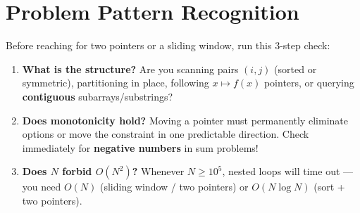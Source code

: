 \documentclass[11pt,a4paper]{article}
\theoremstyle{definition}
\begin{document}
\section{Problem Pattern Recognition}

Before reaching for two pointers or a sliding window, run this 3-step check:
\begin{enumerate}[itemsep=2pt, topsep=2pt]
    \item \textbf{What is the structure?} Are you scanning pairs $(i, j)$ (sorted or symmetric), partitioning in place, following $x \mapsto f(x)$ pointers, or querying \textbf{contiguous} subarrays/substrings?
    \item \textbf{Does monotonicity hold?} Moving a pointer must permanently eliminate options or move the constraint in one predictable direction. Check immediately for \textbf{negative numbers} in sum problems!
    \item \textbf{Does $N$ forbid $O(N^2)$?} Whenever $N \ge 10^5$, nested loops will time out --- you need $O(N)$ (sliding window / two pointers) or $O(N \log N)$ (sort + two pointers).
\end{enumerate}
\end{document}
